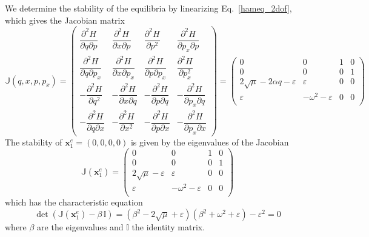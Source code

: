 \documentclass{ws-ijbc}
\begin{document}
We determine the stability of the equilibria by linearizing Eq.~\eqref{hameq_2dof}, which gives the Jacobian matrix
\begin{equation}
\mathbb{J}(q,x,p,p_x) = 
\begin{pmatrix}
\dfrac{\partial^2 H}{\partial q \partial p} & \dfrac{\partial^2 H}{\partial x \partial p} & \dfrac{\partial^2 H}{\partial p^2} & \dfrac{\partial^2 H}{\partial p_x \partial p}  \\[.4cm]
\dfrac{\partial^2 H}{\partial q \partial p_x} & \dfrac{\partial^2 H}{\partial x \partial p_x} & \dfrac{\partial^2 H}{\partial p \partial p_x} & \dfrac{\partial^2 H}{\partial p_x^2}  \\[.4cm]
-\dfrac{\partial^2 H}{\partial q^2} & -\dfrac{\partial^2 H}{\partial x \partial q} & -\dfrac{\partial^2 H}{\partial p \partial q} & -\dfrac{\partial^2 H}{\partial p_x \partial q}  \\[.4cm]
-\dfrac{\partial^2 H}{\partial q \partial x} & -\dfrac{\partial^2 H}{\partial x^2} & -\dfrac{\partial^2 H}{\partial p \partial x} & -\dfrac{\partial^2 H}{\partial p_x \partial x} 
\end{pmatrix} = 
\begin{pmatrix}
0 & 0 & 1 & 0 \\
0 & 0 & 0 & 1 \\
2\sqrt{\mu} - 2\alpha q - \varepsilon & \varepsilon & 0 & 0 \\
\varepsilon & -\omega^2 - \varepsilon & 0 & 0 \\
\end{pmatrix}
\end{equation}
The stability of $\mathbf{x}_1^e = (0,0,0,0) $ is given by the eigenvalues of the Jacobian
\begin{equation}
\mathbb{J}(\mathbf{x}_1^e) = 
\begin{pmatrix}
0 & 0 & 1 & 0 \\
0 & 0 & 0 & 1 \\
2\sqrt{\mu} - \varepsilon & \varepsilon & 0 & 0 \\
\varepsilon & -\omega^2 - \varepsilon & 0 & 0 \\
\end{pmatrix}
\label{eqn:jacobian_2dof}
\end{equation}
which has the characteristic equation
\begin{equation}
\det\left(\mathbb{J}(\mathbf{x}_1^e) - \beta \, \mathbb{I}\right) = \left(\beta^2 - 2\sqrt{\mu} + \varepsilon\right) \left(\beta^2 + \omega^2 + \varepsilon\right) - \varepsilon^2 = 0
\label{char_eq}
\end{equation}
where $\beta$ are the eigenvalues and $\mathbb{I}$ the identity matrix.
\end{document}
